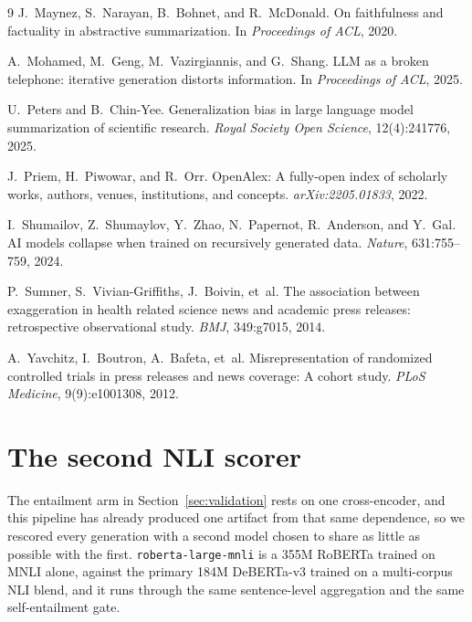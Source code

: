\documentclass{article}
\begin{document}
\begin{thebibliography}{9}
J.~Maynez, S.~Narayan, B.~Bohnet, and R.~McDonald.
\newblock On faithfulness and factuality in abstractive summarization.
\newblock In \emph{Proceedings of ACL}, 2020.

A.~Mohamed, M.~Geng, M.~Vazirgiannis, and G.~Shang.
\newblock LLM as a broken telephone: iterative generation distorts information.
\newblock In \emph{Proceedings of ACL}, 2025.

U.~Peters and B.~Chin-Yee.
\newblock Generalization bias in large language model summarization of scientific research.
\newblock \emph{Royal Society Open Science}, 12(4):241776, 2025.

J.~Priem, H.~Piwowar, and R.~Orr.
\newblock OpenAlex: A fully-open index of scholarly works, authors, venues, institutions, and concepts.
\newblock \emph{arXiv:2205.01833}, 2022.

I.~Shumailov, Z.~Shumaylov, Y.~Zhao, N.~Papernot, R.~Anderson, and Y.~Gal.
\newblock AI models collapse when trained on recursively generated data.
\newblock \emph{Nature}, 631:755--759, 2024.

P.~Sumner, S.~Vivian-Griffiths, J.~Boivin, et~al.
\newblock The association between exaggeration in health related science news and academic press releases: retrospective observational study.
\newblock \emph{BMJ}, 349:g7015, 2014.

A.~Yavchitz, I.~Boutron, A.~Bafeta, et~al.
\newblock Misrepresentation of randomized controlled trials in press releases and news coverage: A cohort study.
\newblock \emph{PLoS Medicine}, 9(9):e1001308, 2012.

\end{thebibliography}

\appendix
\section{The second NLI scorer}
\label{app:crosscheck}

The entailment arm in Section~\ref{sec:validation} rests on one cross-encoder, and this pipeline has already produced one artifact from that same dependence, so we rescored every generation with a second model chosen to share as little as possible with the first. \texttt{roberta-large-mnli} is a 355M RoBERTa trained on MNLI alone, against the primary 184M DeBERTa-v3 trained on a multi-corpus NLI blend, and it runs through the same sentence-level aggregation and the same self-entailment gate.
\end{document}
